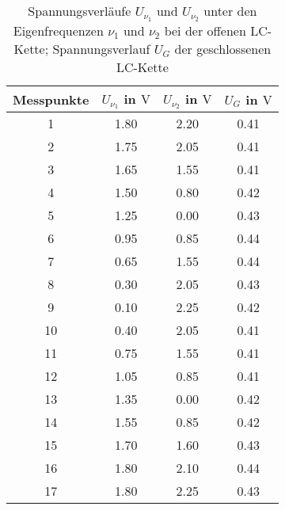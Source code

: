 \begin{table} 
\centering 
\caption{Spannungsverläufe $U_{\nu_1}$ und $U_{\nu_2}$ unter den Eigenfrequenzen $\nu_1$ und $\nu_2$ bei der offenen LC-Kette; Spannungsverlauf $U_{G}$ der geschlossenen LC-Kette} 
\label{tab: U_nu12} 
\begin{tabular}{S S S S } 
\toprule  
{Messpunkte} & {$U_{\nu_1}$ in $\si{\volt}$} & {$U_{\nu_2}$ in $\si{\volt}$} & {$U_{G}$ in $\si{\volt}$ }  \\ 
  & 1.80  & 2.20  & 0.41\\ 
2  & 1.75  & 2.05  & 0.41\\ 
3  & 1.65  & 1.55  & 0.41\\ 
4  & 1.50  & 0.80  & 0.42\\ 
5  & 1.25  & 0.00  & 0.43\\ 
6  & 0.95  & 0.85  & 0.44\\ 
7  & 0.65  & 1.55  & 0.44\\ 
8  & 0.30  & 2.05  & 0.43\\ 
9  & 0.10  & 2.25  & 0.42\\ 
10  & 0.40  & 2.05  & 0.41\\ 
11  & 0.75  & 1.55  & 0.41\\ 
12  & 1.05  & 0.85  & 0.41\\ 
13  & 1.35  & 0.00  & 0.42\\ 
14  & 1.55  & 0.85  & 0.42\\ 
15  & 1.70  & 1.60  & 0.43\\ 
16  & 1.80  & 2.10  & 0.44\\ 
17  & 1.80  & 2.25  & 0.43\\ 
\bottomrule 
\end{tabular} 
\end{table}